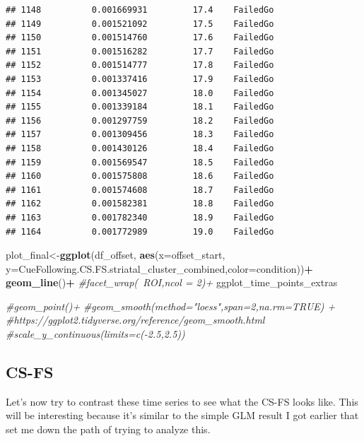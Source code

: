 \documentclass[
]{article}
\newenvironment{Shaded}{\begin{snugshade}}{\end{snugshade}}
\newcommand{\CommentTok}[1]{\textcolor[rgb]{0.56,0.35,0.01}{\textit{#1}}}
\newcommand{\DataTypeTok}[1]{\textcolor[rgb]{0.13,0.29,0.53}{#1}}
\newcommand{\KeywordTok}[1]{\textcolor[rgb]{0.13,0.29,0.53}{\textbf{#1}}}
\newcommand{\NormalTok}[1]{#1}
\newcommand{\OperatorTok}[1]{\textcolor[rgb]{0.81,0.36,0.00}{\textbf{#1}}}
\newcommand{\StringTok}[1]{\textcolor[rgb]{0.31,0.60,0.02}{#1}}
\begin{document}
\begin{verbatim}
## 1148          0.001669931         17.4    FailedGo
## 1149          0.001521092         17.5    FailedGo
## 1150          0.001514760         17.6    FailedGo
## 1151          0.001516282         17.7    FailedGo
## 1152          0.001514777         17.8    FailedGo
## 1153          0.001337416         17.9    FailedGo
## 1154          0.001345027         18.0    FailedGo
## 1155          0.001339184         18.1    FailedGo
## 1156          0.001297759         18.2    FailedGo
## 1157          0.001309456         18.3    FailedGo
## 1158          0.001430126         18.4    FailedGo
## 1159          0.001569547         18.5    FailedGo
## 1160          0.001575808         18.6    FailedGo
## 1161          0.001574608         18.7    FailedGo
## 1162          0.001582381         18.8    FailedGo
## 1163          0.001782340         18.9    FailedGo
## 1164          0.001772989         19.0    FailedGo
\end{verbatim}

\begin{Shaded}
\begin{Highlighting}[]
\NormalTok{plot_final<-}\KeywordTok{ggplot}\NormalTok{(df_offset,}
       \KeywordTok{aes}\NormalTok{(}\DataTypeTok{x=}\NormalTok{offset_start, }\DataTypeTok{y=}\NormalTok{CueFollowing.CS.FS.striatal_cluster_combined,}\DataTypeTok{color=}\NormalTok{condition))}\OperatorTok{+}
\StringTok{  }\KeywordTok{geom_line}\NormalTok{()}\OperatorTok{+}
\StringTok{  }\CommentTok{#facet_wrap(~ROI,ncol = 2)+}
\StringTok{  }\NormalTok{ggplot_time_points_extras}
  
  \CommentTok{#geom_point()+}
  \CommentTok{#geom_smooth(method="loess",span=2,na.rm=TRUE) + #https://ggplot2.tidyverse.org/reference/geom_smooth.html}
  \CommentTok{#scale_y_continuous(limits=c(-2.5,2.5))}
\end{Highlighting}
\end{Shaded}

\hypertarget{cs-fs}{%
\subsection{CS-FS}\label{cs-fs}}

Let's now try to contrast these time series to see what the CS-FS looks
like. This will be interesting because it's similar to the simple GLM
result I got earlier that set me down the path of trying to analyze
this.

\begin{Shaded}
\end{Shaded}
\end{document}
